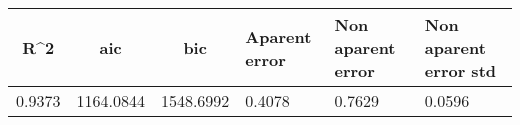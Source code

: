 \begin{tabular}{c|c|c|p{2cm}|p{2cm}|p{2cm}}
\toprule
   R\textasciicircum 2 &       aic &       bic &  Aparent error &  Non aparent error &  Non aparent error std \\
\midrule
0.9373 & 1164.0844 & 1548.6992 &         0.4078 &             0.7629 &                 0.0596 \\
\bottomrule
\end{tabular}
